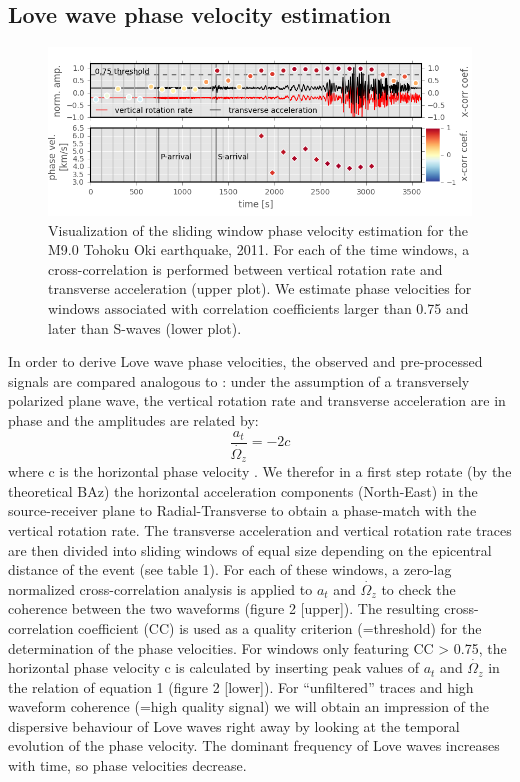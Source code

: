 \documentclass[12pt,reqno]{article} %
\begin{document}
\subsection{Love wave phase velocity estimation}
\begin{figure}[!htp]
\centering
\includegraphics[width=\textwidth]{paper_plot1.png}
\caption{Visualization of the sliding window phase velocity estimation for the M9.0 Tohoku Oki earthquake, 2011. For each of the time windows, a cross-correlation is performed between vertical rotation rate and transverse acceleration (upper plot). We estimate phase velocities for windows associated with correlation coefficients larger than 0.75 and later than S-waves (lower plot).  }
\label{fig:stretchmar}
\end{figure}
In order to derive Love wave phase velocities, the observed and pre-processed signals are compared analogous to \cite{Igel2005}: under the assumption of a transversely polarized plane wave, the vertical rotation rate and transverse acceleration are in phase and the amplitudes are related by: 
\begin{equation}
	\frac{a_t}{\dot{\Omega_z}} = -2c
\end{equation}
where c is the horizontal phase velocity \citep{McLeod1998, Pancha2000}. We therefor in a first step rotate (by the theoretical BAz) the horizontal acceleration components (North-East) in the source-receiver plane to Radial-Transverse to obtain a phase-match with the vertical rotation rate. The transverse acceleration and vertical rotation rate traces are then divided into sliding windows of equal size depending on the epicentral distance of the event (see table 1).
For each of these windows, a zero-lag normalized cross-correlation analysis is applied to $a_t$ and $\dot{\Omega_z}$ to check the coherence between the two waveforms (figure 2 [upper]). The resulting cross-correlation coefficient (CC) is used as a quality criterion (=threshold) for the determination of the phase velocities. For windows only featuring CC > 0.75, the horizontal phase velocity c is calculated by inserting peak values of $a_t$ and $\dot{\Omega_z}$ in the relation of equation 1 (figure 2 [lower]).
For “unfiltered” traces and high waveform coherence (=high quality signal) we will obtain an impression of the dispersive behaviour of Love waves right away by looking at the temporal evolution of the phase velocity. The dominant frequency of Love waves increases with time, so phase velocities decrease.
\end{document}
